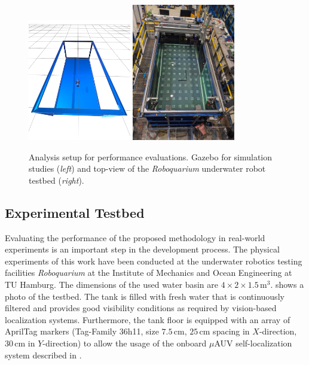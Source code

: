 \begin{figure}
    \centering
    \includegraphics[width=0.4\textwidth]{images/04/gazebo.png}
    \quad\quad
    \includegraphics[width=0.4\textwidth]{images/04/roboquarium_tested_topview.jpg}
    \caption{Analysis setup for performance evaluations. Gazebo for simulation studies (\textit{left}) and top-view of the \textit{Roboquarium} underwater robot testbed (\textit{right}).}
    \label{fig:testbed_topview}
    \label{fig:analysis_setups}
\end{figure}
\subsection{Experimental Testbed}
Evaluating the performance of the proposed methodology in real-world experiments is an important step in the development process.
The physical experiments of this work have been conducted at the underwater robotics testing facilities \textit{Roboquarium} at the Institute of Mechanics and Ocean Engineering at TU Hamburg.
The dimensions of the used water basin are $4\times2\times1.5\,\mathrm{m}^3$.
 shows a photo of the testbed.
The tank is filled with fresh water that is continuously filtered and provides good visibility conditions as required by vision-based localization systems.
Furthermore, the tank floor is equipped with an array of AprilTag markers (Tag-Family 36h11, size $7.5$\,cm, $25$\,cm spacing in $X$-direction, $30$\,cm in $Y$-direction) to allow the usage of the onboard $\mu$AUV self-localization system described in \cite{Duecker20}.



